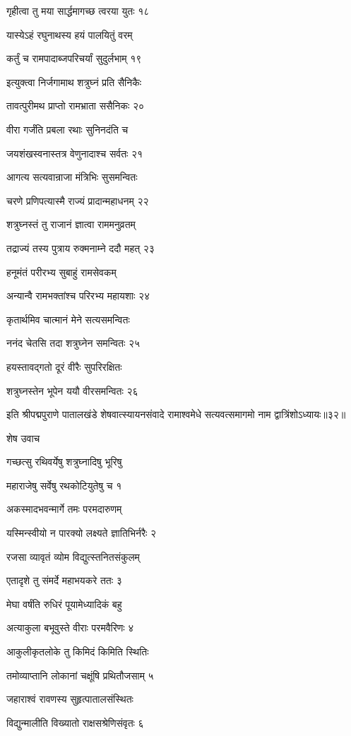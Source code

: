 गृहीत्वा तु मया सार्द्धमागच्छ त्वरया युतः १८

यास्येऽहं रघुनाथस्य हयं पालयितुं वरम्

कर्तुं च रामपादाब्जपरिचर्यां सुदुर्लभाम् १९

इत्युक्त्वा निर्जगामाथ शत्रुघ्नं प्रति सैनिकैः

तावत्पुरीमथ प्राप्तो रामभ्राता ससैनिकः २०

वीरा गर्जंति प्रबला रथाः सुनिनदंति च

जयशंखस्वनास्तत्र वेणुनादाश्च सर्वतः २१

आगत्य सत्यवान्राजा मंत्रिभिः सुसमन्वितः

चरणे प्रणिपत्यास्मै राज्यं प्रादान्महाधनम् २२

शत्रुघ्नस्तं तु राजानं ज्ञात्वा राममनुव्रतम्

तद्राज्यं तस्य पुत्राय रुक्मनाम्ने ददौ महत् २३

हनूमंतं परीरभ्य सुबाहुं रामसेवकम्

अन्यान्वै रामभक्तांश्च परिरभ्य महायशाः २४

कृतार्थमिव चात्मानं मेने सत्यसमन्वितः

ननंद चेतसि तदा शत्रुघ्नेन समन्वितः २५

हयस्तावद्गतो दूरं वीरैः सुपरिरक्षितः

शत्रुघ्नस्तेन भूपेन ययौ वीरसमन्वितः २६

इति श्रीपद्मपुराणे पातालखंडे शेषवात्स्यायनसंवादे रामाश्वमेधे सत्यवत्समागमो नाम द्वात्रिंशोऽध्यायः॥३२॥


शेष उवाच

गच्छत्सु रथिवर्येषु शत्रुघ्नादिषु भूरिषु

महाराजेषु सर्वेषु रथकोटियुतेषु च १

अकस्मादभवन्मार्गे तमः परमदारुणम्

यस्मिन्स्वीयो न पारक्यो लक्ष्यते ज्ञातिभिर्नरैः २

रजसा व्यावृतं व्योम विद्युत्स्तनितसंकुलम्

एतादृशे तु संमर्दे महाभयकरे ततः ३

मेघा वर्षंति रुधिरं पूयामेध्यादिकं बहु

अत्याकुला बभूवुस्ते वीराः परमवैरिणः ४

आकुलीकृतलोके तु किमिदं किमिति स्थितिः

तमोव्याप्तानि लोकानां चक्षूंषि प्रथितौजसाम् ५

जहाराश्वं रावणस्य सुहृत्पातालसंस्थितः

विद्युन्मालीति विख्यातो राक्षसश्रेणिसंवृतः ६

